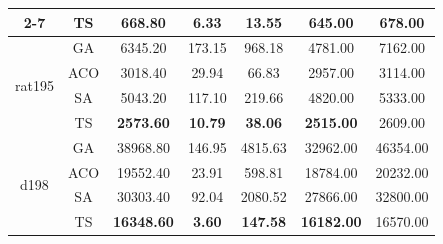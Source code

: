 \begin{table}[H]
\begin{center}
\begin{tabular}{|c|c|c|c|c|c|c|}
            \cline{2-7}
            & TS & \textbf{668.80} & \textbf{6.33} & \textbf{13.55} & \textbf{645.00} & 678.00 \\
            \hline
            \multirow{4}{*}{rat195} & GA & 6345.20 & 173.15 & 968.18 & 4781.00 & 7162.00 \\
            \cline{2-7}
            & ACO & 3018.40 & 29.94 & 66.83 & 2957.00 & 3114.00 \\
            \cline{2-7}
            & SA & 5043.20 & 117.10 & 219.66 & 4820.00 & 5333.00 \\
            \cline{2-7}
            & TS & \textbf{2573.60} & \textbf{10.79} & \textbf{38.06} & \textbf{2515.00} & 2609.00 \\
            \hline
            \multirow{4}{*}{d198} & GA & 38968.80 & 146.95 & 4815.63 & 32962.00 & 46354.00 \\
            \cline{2-7}
            & ACO & 19552.40 & 23.91 & 598.81 & 18784.00 & 20232.00 \\
            \cline{2-7}
            & SA & 30303.40 & 92.04 & 2080.52 & 27866.00 & 32800.00 \\
            \cline{2-7}
            & TS & \textbf{16348.60} & \textbf{3.60} & \textbf{147.58} & \textbf{16182.00} & 16570.00 \\
            \hline
        \end{tabular}
    \end{center}
\end{table}

